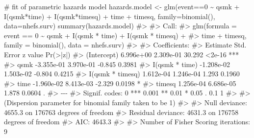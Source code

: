 \documentclass[
  10pt,
  a4paper,
]{book}
\newenvironment{Shaded}{\begin{snugshade}}{\end{snugshade}}
\newcommand{\AttributeTok}[1]{\textcolor[rgb]{0.40,0.45,0.13}{#1}}
\newcommand{\CommentTok}[1]{\textcolor[rgb]{0.37,0.37,0.37}{#1}}
\newcommand{\DecValTok}[1]{\textcolor[rgb]{0.68,0.00,0.00}{#1}}
\newcommand{\FunctionTok}[1]{\textcolor[rgb]{0.28,0.35,0.67}{#1}}
\newcommand{\NormalTok}[1]{\textcolor[rgb]{0.00,0.46,0.62}{#1}}
\newcommand{\OtherTok}[1]{\textcolor[rgb]{0.00,0.46,0.62}{#1}}
\newcommand{\SpecialCharTok}[1]{\textcolor[rgb]{0.37,0.37,0.37}{#1}}
\begin{document}
\begin{Shaded}
\begin{Highlighting}[]
\CommentTok{\# fit of parametric hazards model}
\NormalTok{hazards.model }\OtherTok{\textless{}{-}} \FunctionTok{glm}\NormalTok{(event}\SpecialCharTok{==}\DecValTok{0} \SpecialCharTok{\textasciitilde{}}\NormalTok{ qsmk }\SpecialCharTok{+} \FunctionTok{I}\NormalTok{(qsmk}\SpecialCharTok{*}\NormalTok{time) }\SpecialCharTok{+} \FunctionTok{I}\NormalTok{(qsmk}\SpecialCharTok{*}\NormalTok{timesq) }\SpecialCharTok{+}
\NormalTok{                       time }\SpecialCharTok{+}\NormalTok{ timesq, }\AttributeTok{family=}\FunctionTok{binomial}\NormalTok{(), }\AttributeTok{data=}\NormalTok{nhefs.surv)}
\FunctionTok{summary}\NormalTok{(hazards.model)}
\CommentTok{\#\textgreater{} }
\CommentTok{\#\textgreater{} Call:}
\CommentTok{\#\textgreater{} glm(formula = event == 0 \textasciitilde{} qsmk + I(qsmk * time) + I(qsmk * timesq) + }
\CommentTok{\#\textgreater{}     time + timesq, family = binomial(), data = nhefs.surv)}
\CommentTok{\#\textgreater{} }
\CommentTok{\#\textgreater{} Coefficients:}
\CommentTok{\#\textgreater{}                    Estimate Std. Error z value Pr(\textgreater{}|z|)    }
\CommentTok{\#\textgreater{} (Intercept)       6.996e+00  2.309e{-}01  30.292   \textless{}2e{-}16 ***}
\CommentTok{\#\textgreater{} qsmk             {-}3.355e{-}01  3.970e{-}01  {-}0.845   0.3981    }
\CommentTok{\#\textgreater{} I(qsmk * time)   {-}1.208e{-}02  1.503e{-}02  {-}0.804   0.4215    }
\CommentTok{\#\textgreater{} I(qsmk * timesq)  1.612e{-}04  1.246e{-}04   1.293   0.1960    }
\CommentTok{\#\textgreater{} time             {-}1.960e{-}02  8.413e{-}03  {-}2.329   0.0198 *  }
\CommentTok{\#\textgreater{} timesq            1.256e{-}04  6.686e{-}05   1.878   0.0604 .  }
\CommentTok{\#\textgreater{} {-}{-}{-}}
\CommentTok{\#\textgreater{} Signif. codes:  0 \textquotesingle{}***\textquotesingle{} 0.001 \textquotesingle{}**\textquotesingle{} 0.01 \textquotesingle{}*\textquotesingle{} 0.05 \textquotesingle{}.\textquotesingle{} 0.1 \textquotesingle{} \textquotesingle{} 1}
\CommentTok{\#\textgreater{} }
\CommentTok{\#\textgreater{} (Dispersion parameter for binomial family taken to be 1)}
\CommentTok{\#\textgreater{} }
\CommentTok{\#\textgreater{}     Null deviance: 4655.3  on 176763  degrees of freedom}
\CommentTok{\#\textgreater{} Residual deviance: 4631.3  on 176758  degrees of freedom}
\CommentTok{\#\textgreater{} AIC: 4643.3}
\CommentTok{\#\textgreater{} }
\CommentTok{\#\textgreater{} Number of Fisher Scoring iterations: 9}


\end{Highlighting}
\end{Shaded}
\end{document}
